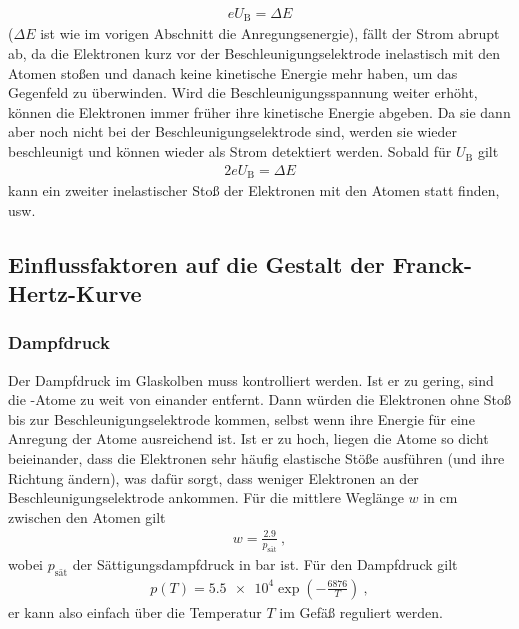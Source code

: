 \begin{align}\label{eq:energie2}
	eU_\text{B} = \Delta E 
\end{align}
($\Delta E$ ist wie im vorigen Abschnitt die Anregungsenergie), fällt der Strom abrupt ab, da die Elektronen kurz vor der Beschleunigungselektrode inelastisch mit den Atomen stoßen und danach keine kinetische Energie mehr haben, um das Gegenfeld zu überwinden. Wird die Beschleunigungsspannung weiter erhöht, können die Elektronen immer früher ihre kinetische Energie abgeben. Da sie dann aber noch nicht bei der Beschleunigungselektrode sind, werden sie wieder beschleunigt und können wieder als Strom detektiert werden. Sobald für $U_\text{B}$ gilt
\begin{align}
	2eU_\text{B} = \Delta E
\end{align}
kann ein zweiter inelastischer Stoß der Elektronen mit den Atomen statt finden, usw.

\subsection{Einflussfaktoren auf die Gestalt der Franck-Hertz-Kurve\label{sec:Aufbau}}
\subsubsection*{Dampfdruck}
Der Dampfdruck im Glaskolben muss kontrolliert werden. Ist er zu gering, sind die -Atome zu weit von einander entfernt. Dann würden die Elektronen ohne Stoß bis zur Beschleunigungselektrode kommen, selbst wenn ihre Energie für eine Anregung der Atome ausreichend ist. Ist er zu hoch, liegen die Atome so dicht beieinander, dass die Elektronen sehr häufig elastische Stöße ausführen (und ihre Richtung ändern), was dafür sorgt, dass weniger Elektronen an der Beschleunigungselektrode ankommen. Für die mittlere Weglänge $w$ in \si{\centi\meter} zwischen den Atomen gilt
\begin{align}\label{eq:weglange}
	w = \frac{2.9}{p_\text{sät}} \ ,
\end{align}
wobei $p_\text{sät}$ der Sättigungsdampfdruck in \si{\bar} ist. Für den Dampfdruck gilt
\begin{align}\label{eq:dampfdruck}
	p(T) = \SI{5.5e4}\exp\left(-\frac{6876}{T}\right) \ ,
\end{align}
er kann also einfach über die Temperatur $T$ im Gefäß reguliert werden.
